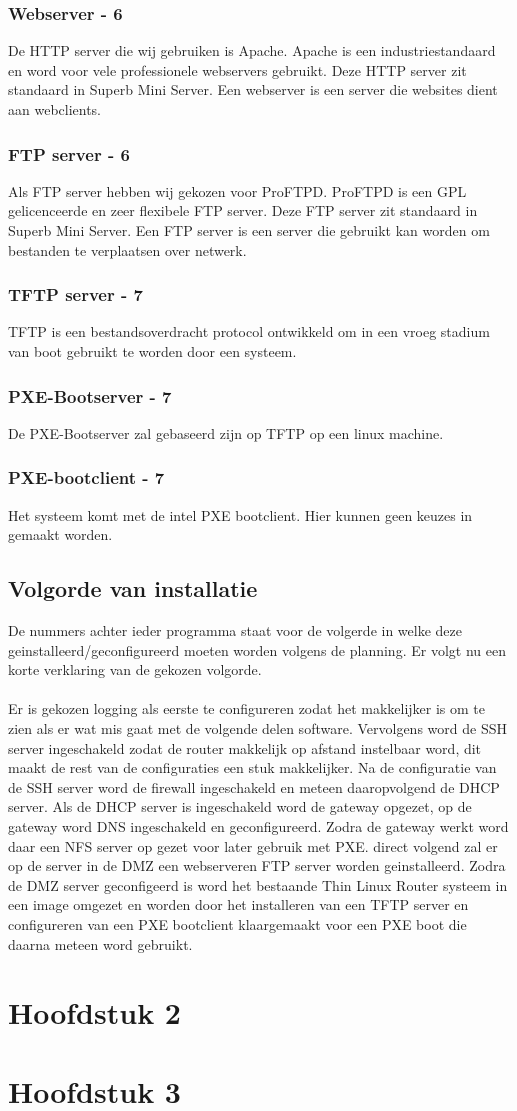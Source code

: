 \documentclass[12pt]{article}
\begin{document}
\subsubsection{Webserver - 6}
De HTTP server die wij gebruiken is Apache. Apache is een industriestandaard en word voor vele professionele webservers gebruikt. Deze HTTP server zit standaard in Superb Mini Server. Een webserver is een server die websites dient aan webclients.
\subsubsection{FTP server - 6}
Als FTP server hebben wij gekozen voor ProFTPD. ProFTPD is een GPL gelicenceerde en zeer flexibele FTP server. Deze FTP server zit standaard in Superb Mini Server. Een FTP server is een server die gebruikt kan worden om bestanden te verplaatsen over netwerk.
\subsubsection{TFTP server - 7}
TFTP is een bestandsoverdracht protocol ontwikkeld om in een vroeg stadium van boot gebruikt te worden door een systeem.
\subsubsection{PXE-Bootserver - 7}
De PXE-Bootserver zal gebaseerd zijn op TFTP op een linux machine.
\subsubsection{PXE-bootclient - 7}
Het systeem komt met de intel PXE bootclient. Hier kunnen geen keuzes in gemaakt worden.
\subsection{Volgorde van installatie}
De nummers achter ieder programma staat voor de volgerde in welke deze geinstalleerd/geconfigureerd moeten worden volgens de planning. Er volgt nu een korte verklaring van de gekozen volgorde.
\paragraph{}
Er is gekozen logging als eerste te configureren zodat het makkelijker is om te zien als er wat mis gaat met de volgende delen software. Vervolgens word de SSH server ingeschakeld zodat de router makkelijk op afstand instelbaar word, dit maakt de rest van de configuraties een stuk makkelijker. Na de configuratie van de SSH server word de firewall ingeschakeld en meteen daaropvolgend de DHCP server. Als de DHCP server is ingeschakeld word de gateway opgezet, op de gateway word DNS ingeschakeld en geconfigureerd. Zodra de gateway werkt word daar een NFS server op gezet voor later gebruik met PXE. direct volgend zal er op de server in de DMZ een webserveren FTP server worden geinstalleerd. Zodra de DMZ server geconfigeerd is word het bestaande Thin Linux Router systeem in een image omgezet en worden door het installeren van een TFTP server en configureren van een PXE bootclient klaargemaakt voor een PXE boot die daarna meteen word gebruikt.
\section{Hoofdstuk 2}
\lipsum[0-4]
\section{Hoofdstuk 3}
\lipsum[0-4]
\clearpage 
\end{document}
